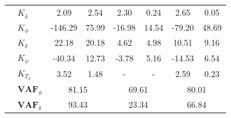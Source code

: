 \begin{table}[]
\begin{tabular}{llcccccc}
                                 & $K_{\dot{\delta}}$    & 2.09                                       & 2.54                                               & 2.30                                       & 0.24                                               & 2.65                                       & 0.05                                               \\
                                 & $K_{\phi} $           & -146.29                                    & 75.99                                              & -16.98                                     & 14.54                                              & -79.20                                     & 48.69                                              \\
                                 & $K_\delta $           & 22.18                                      & 20.18                                              & 4.62                                       & 4.98                                               & 10.51                                      & 9.16                                               \\
                                 & $K_\psi $             & -40.34                                     & 12.73                                              & -3.78                                      & 5.16                                               & -14.53                                     & 6.54                                               \\
                                 & $K_{T_\delta}$        & 3.52                                       & 1.48                                               & -                                          & -                                                  & 2.59                                       & 0.23                                               \\ \cline{2-8} 
                                 & $\mathbf{VAF}_\phi$   & \multicolumn{2}{c}{81.15}                                                                       & \multicolumn{2}{c}{69.61}                                                                       & \multicolumn{2}{c}{80.01}                                                                       \\
                                 & $\mathbf{VAF}_\delta$ & \multicolumn{2}{c}{93.43}                                                                       & \multicolumn{2}{c}{23.34}                                                                       & \multicolumn{2}{c}{66.84}                                                                       \\

\end{tabular}
\end{table}
